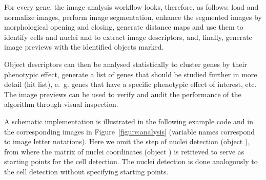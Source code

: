For every gene, the image analysis workflow looks, therefore, as follows: load and normalize images, perform image segmentation, enhance the segmented images by morphological opening and closing, generate distance maps and use them to identify cells and nuclei and to extract image descriptors, and, finally, generate image previews with the identified objects marked. 

Object descriptors can then be analysed statistically to cluster genes by their phenotypic effect, generate a list of genes that should be studied further in more detail (hit list), e.~g. genes that have a specific phenotypic effect of interest, etc. The image previews can be used to verify and audit the performance of the algorithm through visual inspection. 

A schematic implementation is illustrated in the following example code and in the corresponding images in Figure~\ref{figure:analysis} (variable names correspond to image letter notations). Here we omit the step of nuclei detection (object ), from where the matrix of nuclei coordinates (object ) is retrieved to serve as starting points for the cell detection. The nuclei detection is done analogously to the cell detection without specifying starting points.

